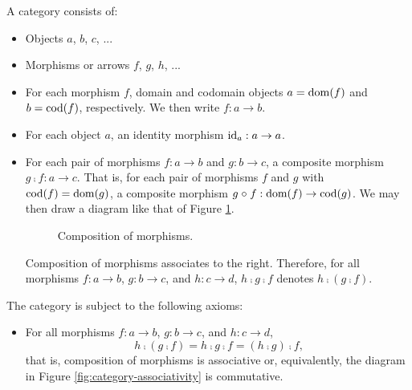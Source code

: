 \begin{definition}
  \label{def:category}


  A category  consists of:
  \begin{itemize}
  \item
    Objects $a$, $b$, $c$, ...

  \item
    Morphisms or arrows $f$, $g$, $h$, ...

  \item
    For each morphism $f$, domain and codomain objects $a = \operatorname{dom}(f)$
    and $b = \operatorname{cod}(f)$, respectively. We then write $f: a \to b$.

  \item
    For each object $a$, an identity morphism $\operatorname{id}_{a}: a \to a$.

  \item
    For each pair of morphisms $f: a \to b$ and $g: b \to c$, a
    composite morphism $g \comp f: a \to c$. That is, for each pair of
    morphisms $f$ and $g$ with $\operatorname{cod}(f) = \operatorname{dom}(g)$, a composite
    morphism $g \mathrel{\circ} f: \operatorname{dom}(f) \to \operatorname{cod}(g)$. We may then draw a
    diagram like that of Figure \ref{fig:category-composition}.

    \begin{figure}[htb]
      \begin{center}
      \end{center}
      \caption{Composition of morphisms.}
      \label{fig:category-composition}
    \end{figure}

    Composition of morphisms associates to the right. Therefore, for
    all morphisms $f: a \to b$, $g: b \to c$, and $h: c \to d$, $h
    \comp g \comp f$ denotes $h \comp (g \comp f)$.

  \end{itemize}
  The category is subject to the following axioms:
  \begin{itemize}
  \item
    For all morphisms $f: a \to b$, $g: b \to c$, and $h: c \to d$,
    \begin{equation}
      \label{eq:category-associativity}
      h \comp (g \comp f) = h \comp g \comp f = (h \comp g) \comp f
      \text{,}
    \end{equation}
    that is, composition of morphisms is associative or, equivalently,
    the diagram in Figure \ref{fig:category-associativity} is
    commutative.


\end{itemize}
\end{definition}
